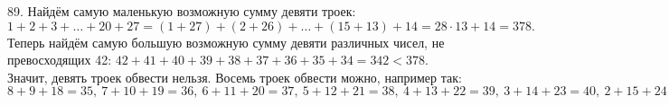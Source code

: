 89. Найдём самую маленькую возможную сумму девяти троек: $1+2+3+\ldots+20+27=(1+27)+(2+26)+\ldots+(15+13)+14=28\cdot13+14=378.$ Теперь найдём самую большую возможную сумму девяти различных чисел, не превосходящих 42: $42+41+40+39+38+37+36+35+34=342<378.$ Значит, девять троек обвести нельзя. Восемь троек обвести можно, например так:
$8+9+18=35,\ 7+10+19=36,\ 6+11+20=37,\ 5+12+21=38,\ 4+13+22=39,\ 3+14+23=40,\ 2+15+24=41,\ 1+16+25=42.$\\
